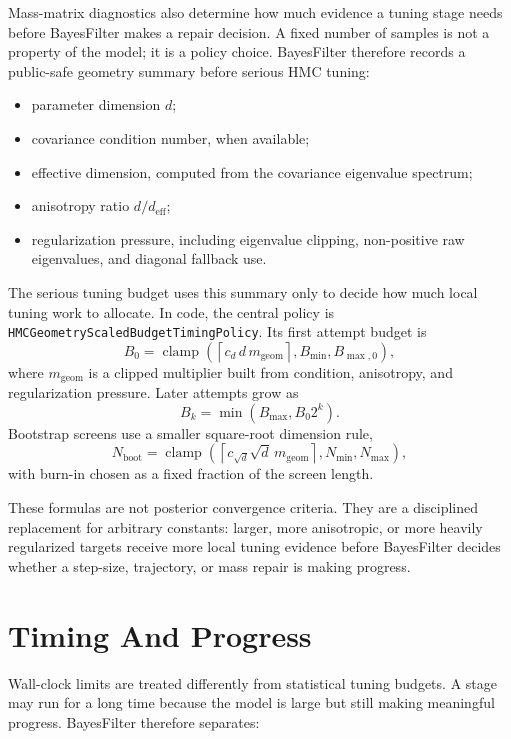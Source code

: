Mass-matrix diagnostics also determine how much evidence a tuning stage needs
before BayesFilter makes a repair decision.  A fixed number of samples is not a
property of the model; it is a policy choice.  BayesFilter therefore records a
public-safe geometry summary before serious HMC tuning:

\begin{itemize}
  \item parameter dimension \(d\);
  \item covariance condition number, when available;
  \item effective dimension, computed from the covariance eigenvalue spectrum;
  \item anisotropy ratio \(d/d_{\mathrm{eff}}\);
  \item regularization pressure, including eigenvalue clipping, non-positive
    raw eigenvalues, and diagonal fallback use.
\end{itemize}

The serious tuning budget uses this summary only to decide how much local
tuning work to allocate.  In code, the central policy is
\texttt{HMCGeometryScaledBudgetTimingPolicy}.  Its first attempt budget is
\[
  B_0 =
  \operatorname{clamp}\left(
    \left\lceil c_d\, d\, m_{\mathrm{geom}}\right\rceil,
    B_{\min}, B_{\max,0}
  \right),
\]
where \(m_{\mathrm{geom}}\) is a clipped multiplier built from condition,
anisotropy, and regularization pressure.  Later attempts grow as
\[
  B_k = \min(B_{\max}, B_0 2^k).
\]
Bootstrap screens use a smaller square-root dimension rule,
\[
  N_{\mathrm{boot}} =
  \operatorname{clamp}\left(
    \left\lceil c_{\sqrt d}\sqrt d\,m_{\mathrm{geom}}\right\rceil,
    N_{\min}, N_{\max}
  \right),
\]
with burn-in chosen as a fixed fraction of the screen length.

These formulas are not posterior convergence criteria.  They are a disciplined
replacement for arbitrary constants: larger, more anisotropic, or more heavily
regularized targets receive more local tuning evidence before BayesFilter
decides whether a step-size, trajectory, or mass repair is making progress.

\section{Timing And Progress}
\label{sec:bf-hmc-timing-and-progress}

Wall-clock limits are treated differently from statistical tuning budgets.  A
stage may run for a long time because the model is large but still making
meaningful progress.  BayesFilter therefore separates:

